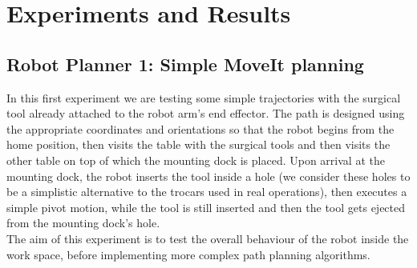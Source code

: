 \section{Experiments and Results}

\subsection{Robot Planner 1: Simple MoveIt planning}

In this first experiment we are testing some simple trajectories with the surgical tool already attached to the robot arm's end effector.
The path is designed using the appropriate coordinates and orientations so that the robot begins from the home position, then visits the table with the surgical 
tools and then visits the other table on top of which the mounting dock is placed. Upon arrival at the mounting dock, the robot inserts the tool inside a hole
(we consider these holes to be a simplistic alternative to the trocars used in real operations), then executes a simple pivot motion, while the tool is still 
inserted and then the tool gets ejected from the mounting dock's hole.\\

The aim of this experiment is to test the overall behaviour of the robot inside the work space, before implementing more complex path planning algorithms.

